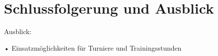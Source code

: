 \chapter{Schlussfolgerung und Ausblick}
\label{ch:zusammenfassung}


Ausblick:

•	Einsatzmöglichkeiten für Turniere und Trainingsstunden